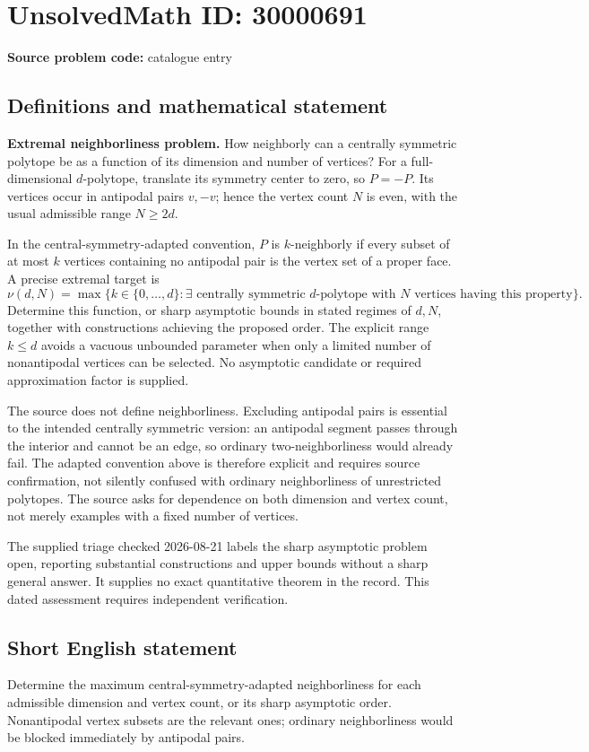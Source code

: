 \documentclass[11pt]{article}
\begin{document}
\section*{UnsolvedMath ID: 30000691}
\textbf{Source problem code:} catalogue entry
\subsection{Definitions and mathematical statement}
\textbf{Extremal neighborliness problem.} How neighborly can a centrally symmetric polytope be as a function of its dimension and number of vertices? For a full-dimensional \(d\)-polytope, translate its symmetry center to zero, so \(P=-P\). Its vertices occur in antipodal pairs \(v,-v\); hence the vertex count \(N\) is even, with the usual admissible range \(N\ge2d\).\par In the central-symmetry-adapted convention, \(P\) is \(k\)-neighborly if every subset of at most \(k\) vertices containing no antipodal pair is the vertex set of a proper face. A precise extremal target is\[\nu(d,N)=\max\{k\in\{0,\ldots,d\}:\exists\text{ centrally symmetric }d\text{-polytope with }N\text{ vertices having this property}\}.\] Determine this function, or sharp asymptotic bounds in stated regimes of \(d,N\), together with constructions achieving the proposed order. The explicit range \(k\le d\) avoids a vacuous unbounded parameter when only a limited number of nonantipodal vertices can be selected. No asymptotic candidate or required approximation factor is supplied.\par The source does not define neighborliness. Excluding antipodal pairs is essential to the intended centrally symmetric version: an antipodal segment passes through the interior and cannot be an edge, so ordinary two-neighborliness would already fail. The adapted convention above is therefore explicit and requires source confirmation, not silently confused with ordinary neighborliness of unrestricted polytopes. The source asks for dependence on both dimension and vertex count, not merely examples with a fixed number of vertices.\par The supplied triage checked 2026-08-21 labels the sharp asymptotic problem open, reporting substantial constructions and upper bounds without a sharp general answer. It supplies no exact quantitative theorem in the record. This dated assessment requires independent verification.
\subsection{Short English statement}
Determine the maximum central-symmetry-adapted neighborliness for each admissible dimension and vertex count, or its sharp asymptotic order. Nonantipodal vertex subsets are the relevant ones; ordinary neighborliness would be blocked immediately by antipodal pairs.
\end{document}
